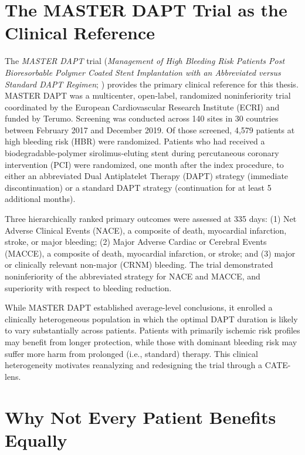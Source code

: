 \section{The MASTER DAPT Trial as the Clinical Reference}

The \textit{MASTER DAPT} trial (\textit{Management of High Bleeding Risk
Patients Post Bioresorbable Polymer Coated Stent Implantation with an
Abbreviated versus Standard DAPT Regimen}; \citet{valgimigli2021masterdapt})
provides the primary clinical reference for this thesis. MASTER DAPT was a
multicenter, open-label, randomized noninferiority trial coordinated by the
European Cardiovascular Research Institute (ECRI) and funded by Terumo. Screening
was conducted across 140 sites in 30 countries between February 2017 and
December 2019. Of those screened, 4,579 patients at high bleeding risk (HBR)
were randomized. Patients
who had received a biodegradable-polymer sirolimus-eluting stent during
percutaneous coronary intervention (PCI) were randomized, one month after
the index procedure, to either an abbreviated Dual Antiplatelet Therapy
(DAPT) strategy (immediate discontinuation) or a standard DAPT strategy
(continuation for at least 5 additional months).

Three hierarchically ranked primary outcomes were assessed at 335 days: (1)
Net Adverse Clinical Events (NACE), a composite of death, myocardial
infarction, stroke, or major bleeding; (2) Major Adverse Cardiac or Cerebral
Events (MACCE), a composite of death, myocardial infarction, or stroke; and
(3) major or clinically relevant non-major (CRNM) bleeding. The trial
demonstrated noninferiority of the abbreviated strategy for NACE and MACCE,
and superiority with respect to bleeding reduction.

While MASTER DAPT established average-level conclusions, it enrolled a
clinically heterogeneous population in which the optimal DAPT duration
is likely to vary substantially across patients. Patients with primarily
ischemic risk profiles may benefit from longer protection, while those with
dominant bleeding risk may suffer more harm from prolonged (i.e., standard)
therapy. This
clinical heterogeneity motivates reanalyzing and redesigning the trial through
a CATE-lens.

\section{Why Not Every Patient Benefits Equally}

